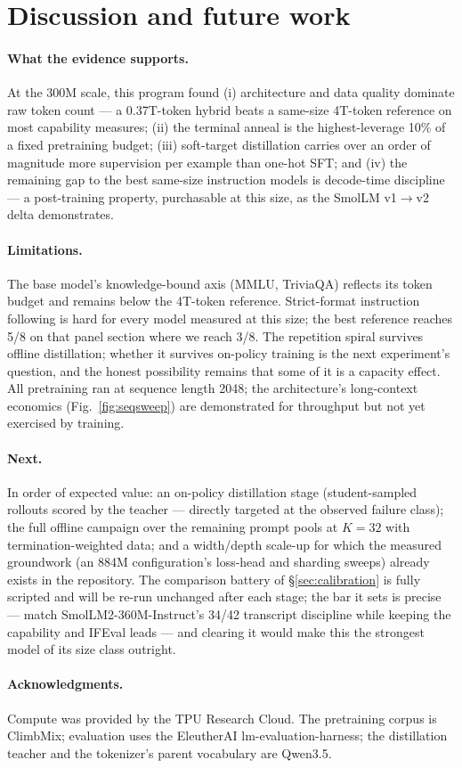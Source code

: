 \section{Discussion and future work}
\label{sec:discussion}

\paragraph{What the evidence supports.} At the 300M scale, this program
found (i) architecture and data quality dominate raw token count --- a
0.37T-token hybrid beats a same-size 4T-token reference on most
capability measures; (ii) the terminal anneal is the highest-leverage
10\% of a fixed pretraining budget; (iii) soft-target distillation
carries over an order of magnitude more supervision per example than
one-hot SFT; and (iv) the remaining gap to the best same-size
instruction models is decode-time discipline --- a post-training
property, purchasable at this size, as the SmolLM v1$\to$v2 delta
demonstrates.

\paragraph{Limitations.} The base model's knowledge-bound axis (MMLU,
TriviaQA) reflects its token budget and remains below the 4T-token
reference. Strict-format instruction following is hard for every model
measured at this size; the best reference reaches 5/8 on that panel
section where we reach 3/8. The repetition spiral survives offline
distillation; whether it survives on-policy training is the next
experiment's question, and the honest possibility remains that some of
it is a capacity effect. All pretraining ran at sequence length 2048;
the architecture's long-context economics
(Fig.~\ref{fig:seqsweep}) are demonstrated for throughput but not yet
exercised by training.

\paragraph{Next.} In order of expected value: an on-policy distillation
stage (student-sampled rollouts scored by the teacher --- directly
targeted at the observed failure class); the full offline campaign over
the remaining prompt pools at $K{=}32$ with termination-weighted data;
and a width/depth scale-up for which the measured groundwork (an 884M
configuration's loss-head and sharding sweeps) already exists in the
repository. The comparison battery of \S\ref{sec:calibration} is fully
scripted and will be re-run unchanged after each stage; the bar it sets
is precise --- match SmolLM2-360M-Instruct's 34/42 transcript discipline
while keeping the capability and IFEval leads --- and clearing it would
make this the strongest model of its size class outright.

\paragraph{Acknowledgments.} Compute was provided by the TPU Research
Cloud. The pretraining corpus is ClimbMix; evaluation uses the
EleutherAI lm-evaluation-harness; the distillation teacher and the
tokenizer's parent vocabulary are Qwen3.5.
